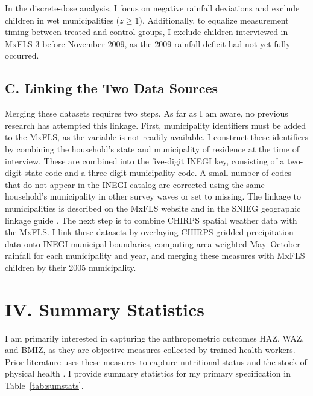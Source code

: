 \documentclass[12pt]{article}
\begin{document}
In the discrete-dose analysis, I focus on negative rainfall deviations and exclude children in wet municipalities ($z \ge 1$). Additionally, to equalize measurement timing between treated and control groups, I exclude children interviewed in MxFLS-3 before November 2009, as the 2009 rainfall deficit had not yet fully occurred.

\subsection*{C. Linking the Two Data Sources}

Merging these datasets requires two steps. As far as I am aware, no previous research has attempted this linkage. First, municipality identifiers must be added to the MxFLS, as the variable is not readily available. I construct these identifiers by combining the household's state and municipality of residence at the time of interview. These are combined into the five-digit INEGI key, consisting of a two-digit state code and a three-digit municipality code. A small number of codes that do not appear in the INEGI catalog are corrected using the same household's municipality in other survey waves or set to missing. The linkage to municipalities is described on the MxFLS website and in the SNIEG geographic linkage guide \parencite{mxflsFrequentlyAskedQuestions,inegiGuiaParaVinculacion2025}. The next step is to combine CHIRPS spatial weather data with the MxFLS. I link these datasets by overlaying CHIRPS gridded precipitation data onto INEGI municipal boundaries, computing area-weighted May--October rainfall for each municipality and year, and merging these measures with MxFLS children by their 2005 municipality.

\section*{IV. Summary Statistics}\label{sec:IV}

I am primarily interested in capturing the anthropometric outcomes HAZ, WAZ, and BMIZ, as they are objective measures collected by trained health workers. Prior literature uses these measures to capture nutritional status and the stock of physical health \parencite{adairAgeSpecificDeterminantsStunting1997,hoddinottAdultConsequencesGrowth2013,gilesProtectingChildNutritional2015}. I provide summary statistics for my primary specification in Table~\ref{tab:sumstats}.
\end{document}
